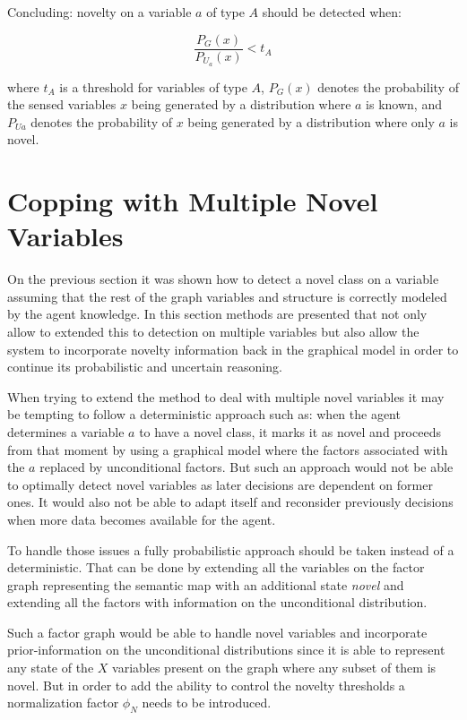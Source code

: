 Concluding: novelty on a variable $a$ of type $A$ should be detected when:

\begin{equation}
\frac{P_G(x)}{P_{U_a}(x)} < t_A
\end{equation}

where $t_A$ is a threshold for variables of type $A$, $P_G(x)$ denotes the
probability of the sensed variables $x$ being generated by a distribution
where $a$ is known, and $P_{Ua}$ denotes the probability of $x$ being generated
by a distribution where only $a$ is novel.

\section{Copping with Multiple Novel Variables}
On the previous section it was shown how to detect a novel class on a variable
assuming that the rest of the graph variables and structure is correctly modeled
by the agent knowledge.
In this section methods are presented that not only allow to extended this to
detection on multiple variables but also allow the system to incorporate
novelty information back in the graphical model in order to continue its
probabilistic and uncertain reasoning.

When trying to extend the method to deal with multiple novel variables it may
be tempting to follow a deterministic approach such as:
when the agent determines a variable $a$ to have a novel class, it marks it as
novel and proceeds from that moment by using a graphical model where the factors
associated with the $a$ replaced by unconditional factors.
But such an approach would not be able to optimally detect novel variables
as later decisions are dependent on former ones.
It would also not be able to adapt itself and reconsider previously decisions
when more data becomes available for the agent.

To handle those issues a fully probabilistic approach should be taken
instead of a deterministic.
That can be done by extending all the variables on the factor graph representing
the semantic map with an additional state \emph{novel} and extending all the
factors with information on the unconditional distribution.

Such a factor graph would be able to handle novel variables and incorporate
prior-information on the unconditional distributions since it is able to
represent any state of the $X$ variables present on the graph where any
subset of them is novel. But in order to add the ability to control the
novelty thresholds a normalization factor $\phi_N$ needs to be introduced.

